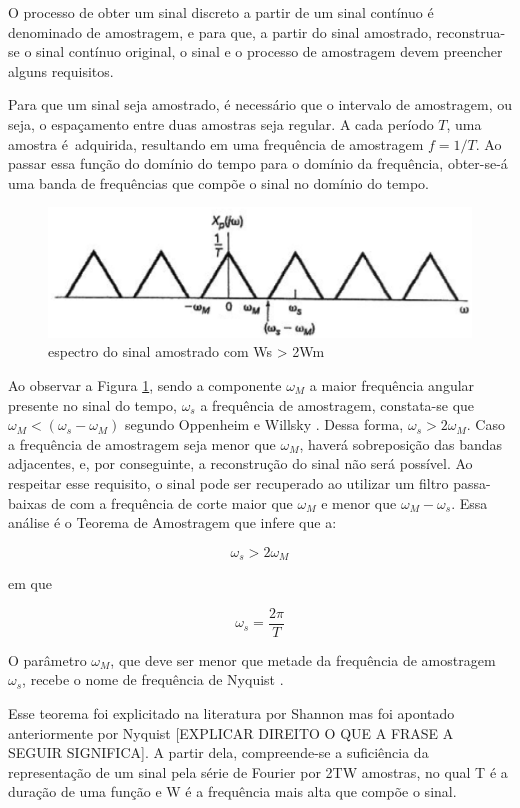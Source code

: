 O processo de obter um sinal discreto a partir de um sinal contínuo é denominado de amostragem, e para que, a partir do sinal amostrado, reconstrua-se o sinal contínuo original, o sinal e o processo de amostragem devem preencher alguns requisitos.

Para que um sinal seja amostrado, é necessário que o intervalo de amostragem, ou seja, o espaçamento entre duas amostras seja regular. A cada período $T$, uma amostra é adquirida, resultando em uma frequência de amostragem $f = 1/T$.
Ao passar essa função do domínio do tempo para o domínio da frequência, obter-se-á uma banda de frequências que compõe o sinal no domínio do tempo.

\begin{figure}[h]
	\centering
    \includegraphics[scale=0.5]{figuras/fig03.eps}
	\caption{espectro do sinal amostrado com Ws > 2Wm}
	\label{fig03}
\end{figure}

Ao observar a Figura \ref{fig03}, sendo a componente $\omega_M$ a maior frequência angular presente no sinal do tempo, $\omega_s$ a frequência de amostragem, constata-se que $\omega_M<(\omega_s-\omega_M)$ segundo Oppenheim e Willsky \cite{oppenheim2010sinais}. Dessa forma, $\omega_s>2\omega_M$. Caso a frequência de amostragem seja menor que $\omega_M$, haverá sobreposição das bandas adjacentes, e, por conseguinte, a reconstrução do sinal não será possível. Ao respeitar esse requisito, o sinal pode ser recuperado ao utilizar um filtro passa-baixas de com a frequência de corte maior que $\omega_M$ e menor que $\omega_M-\omega_s$.
Essa análise é o Teorema de Amostragem que infere que a:

\begin{equation} \label{eq:01}
\omega_s>2\omega_M
\end{equation}

em que

\begin{equation} \label{eq:02}
\omega_s=\frac{2\pi}{T}
\end{equation}

O parâmetro $\omega_M$, que deve ser menor que metade da frequência de amostragem  $\omega_s$, recebe o nome de frequência de Nyquist \cite{oppenheim2010sinais}.
\par
Esse teorema foi explicitado na literatura por Shannon \cite{Shannon} mas foi apontado anteriormente por Nyquist \cite{nyquist} [EXPLICAR DIREITO O QUE A FRASE A SEGUIR SIGNIFICA]. A partir dela, compreende-se a suficiência da representação de um sinal pela série de Fourier por 2TW amostras, no qual T é a duração de uma função e W é a frequência mais alta que compõe o sinal.

